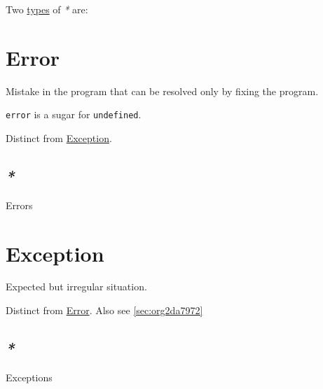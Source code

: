 \documentclass[a4paper,14pt,oneside]{book}
\begin{document}
Two \hyperref[org06447a0]{types} of \emph{*} are:

\chapter{\label{orgc9a399b}Error}
\label{sec:org890ed06}
Mistake in the program that can be resolved only by fixing the program.

\texttt{error} is a sugar for \texttt{undefined}.

Distinct from \hyperref[org4135e17]{Exception}.

\section{\emph{*}}
\label{sec:org54f50b8}

\label{org4e2ba65}Errors

\chapter{\label{org4135e17}Exception}
\label{sec:org76dab18}
Expected but irregular situation.

Distinct from \hyperref[orgc9a399b]{Error}. Also see \ref{sec:org2da7972}

\section{\emph{*}}
\label{sec:org1adc85f}

\label{orgcee4950}Exceptions
\end{document}

